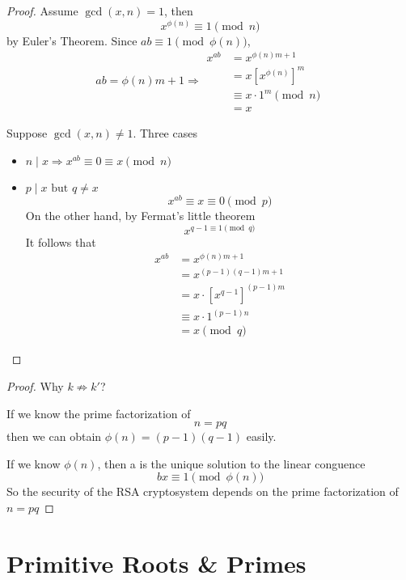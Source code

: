 \begin{proof}
    Assume $\gcd(x, n) = 1$, then
    \[
        x^{\phi(n)} \equiv 1 \pmod n
    \]
    by Euler's Theorem.
    Since $ab \equiv 1 \pmod {\phi(n)}$,
    \[
        ab = \phi(n)m+1 \Rightarrow
        \begin{aligned}
            x^{ab} &= x^{\phi(n)m + 1}\\
            &= x {[x^{\phi(n)}]}^m\\
            &\equiv x \cdot 1^m \pmod n\\
            &=x
        \end{aligned}
    \]

    Suppose $\gcd(x, n) \neq 1$. Three cases
    \begin{itemize}
        \item $n\; |\; x \Rightarrow x^{ab} \equiv 0 \equiv x \pmod n$
        \item $p\; |\; x \text{ but } q \neq x$
        \[
            x^{ab} \equiv x \equiv 0 \pmod p
        \]
        On the other hand, by Fermat's little theorem
        \[
            x^{q-1 \equiv 1 \pmod q}
        \]
        It follows that
        \[
            \begin{aligned}
                x^{ab} &= x^{\phi(n)m+1}\\
                &= x^{(p-1)(q-1)m+1}\\
                &= x\cdot{[x^{q-1}]}^{(p-1)m}\\
                &\equiv x\cdot 1^{(p-1)n}\\
                &= x \pmod q
            \end{aligned}
        \]
    \end{itemize}
    
\end{proof}

\begin{proof}
    Why $k \not\Rightarrow k\prime$?

    If we know the prime factorization of 
    \[  
        n = pq
    \]
    then we can obtain $\phi(n) = (p-1)(q-1)$ easily.

    If we know $\phi(n)$, then a is the unique solution to the linear conguence
    \[
        bx \equiv 1 \pmod{\phi(n)}
    \]
    So the security of the RSA cryptosystem depends on the prime factorization of 
    $n = pq$
\end{proof}

\section{Primitive Roots \& Primes}

